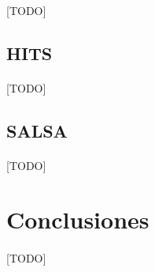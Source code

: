 \documentclass{subfiles}
\begin{document}
          \paragraph{}
          [TODO]

        \subsection{HITS}
        \label{sec:hits}

          \paragraph{}
          [TODO]

        \subsection{SALSA}
        \label{sec:salsa}

          \paragraph{}
          [TODO]

    \section{Conclusiones}
    \label{sec:pagerank_conclusions}

      \paragraph{}
      [TODO]
\end{document}
